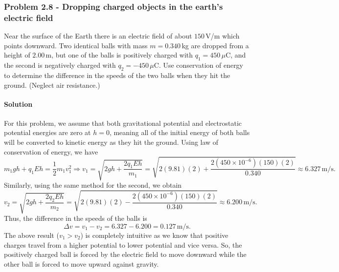 \documentclass{article}
\begin{document}
\subsubsection*{Problem 2.8 - Dropping charged objects in the earth's electric field}
Near the surface of the Earth there is an electric field of
about $150\,$V/m which points downward. Two identical balls with mass $m=0.340$\,kg are dropped from a height of
$2.00$\,m, but one of the balls is positively charged with $q_1=450\,\mu$C, and the second is negatively charged with $q_2=-450\,\mu$C. Use conservation of energy to determine
the difference in the speeds of the two balls when they hit
the ground. (Neglect air resistance.)
\\
\\\textbf{Solution}
\\
\\For this problem, we assume that both gravitational potential and electrostatic potential energies are zero at $h=0$, meaning all of the initial energy of both balls will be converted to kinetic energy as they hit the ground. Using law of conservation of energy, we have
\[m_1gh+q_1Eh=\frac{1}{2}m_1v_1^2\Rightarrow v_1=\sqrt{2gh+\frac{2q_1Eh}{m_1}}=\sqrt{2(9.81)(2)+\frac{2(450\times10^{-6})(150)(2)}{0.340}}\approx6.327\,\text{m/s}.\]
Similarly, using the same method for the second, we obtain
\[v_2=\sqrt{2gh+\frac{2q_2Eh}{m_2}}=\sqrt{2(9.81)(2)-\frac{2(450\times10^{-6})(150)(2)}{0.340}}\approx6.200\,\text{m/s}.\]
Thus, the difference in the speeds of the balls is
\[\Delta v=v_1-v_2=6.327-6.200=0.127\,\text{m/s}.\]
The above result ($v_1>v_2$) is completely intuitive as we know that positive charges travel from a higher potential to lower potential and vice versa. So, the positively charged ball is forced by the electric field to move downward while the other ball is forced to move upward against gravity.
\end{document}
